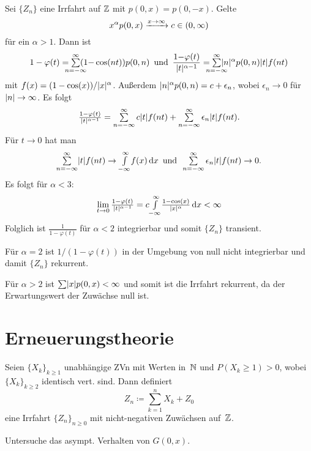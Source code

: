 \documentclass{cheat-sheet}
\begin{document}
\begin{bsp}
  Sei $\{ Z_n \}$ eine Irrfahrt auf $\mathbb{Z}$ mit $p(0, x) = p(0, -x)$.
  Gelte
  \[ x^\alpha p(0, x) \xrightarrow{x \to \infty} c \in \left( 0, \infty \right) \]
  für ein $\alpha > 1$.
  Dann ist
  \[
    1 - \varphi(t) = \sum_{\mathclap{n=-\infty}}^\infty (1{-}\cos(nt)) p(0, n)
    \enspace \text{und} \enspace
    \frac{1 {-} \varphi(t)}{\abs{t}^{\alpha - 1}} = \sum_{\mathclap{n=-\infty}}^\infty \abs{n}^\alpha p(0, n) \abs{t} f(n t)
  \]
  mit $f(x) = (1 - \cos(x))/\lvert x\rvert^\alpha$.
  Außerdem $\lvert n\rvert^\alpha p(0, n) = c + \epsilon_n$, wobei $\epsilon_n \to 0$ für $\lvert n\rvert \to \infty$.
  Es folgt
  \[
    \tfrac{1 - \varphi(t)}{\abs{t}^{\alpha - 1}} = \sum_{n=-\infty}^\infty c \abs{t} f(n t) + \sum_{n=-\infty}^\infty \epsilon_n \abs{t} f(n t).
  \]
  Für $t \to 0$ hat man
  \[
    \sum_{n=-\infty}^\infty \abs{t} f(n t) \to \Int{-\infty}{\infty}{f(x)}{x}
    \enspace \text{und} \enspace
    \sum_{n=-\infty}^\infty \epsilon_n \abs{t} f(n t) \to 0.
  \]
  Es folgt für $\alpha < 3$:
  \[ \lim_{t \to 0} \tfrac{1 - \varphi(t)}{\lvert t\rvert^{\alpha - 1}} = c {\textstyle \int\limits_{-\infty}^{\infty}} \tfrac{1 - \cos(x)}{\lvert x\rvert^\alpha} \,\mathrm{d} x < \infty \]
  Folglich ist $\tfrac{1}{1 - \varphi(t)}$ für $\alpha < 2$ integrierbar und somit $\{ Z_n \}$ transient.

  Für $\alpha = 2$ ist $1/(1 - \varphi(t))$ in der Umgebung von null nicht integrierbar und damit $\{ Z_n \}$ rekurrent.

  Für $\alpha > 2$ ist $\sum \abs{x} p(0, x) < \infty$ und somit ist die Irrfahrt rekurrent, da der Erwartungswert der Zuwächse null ist.
\end{bsp}


\section{Erneuerungstheorie}

\begin{situation}
  Seien $\{ X_k \}_{k \geq 1}$ unabhängige ZVn mit Werten in~$\mathbb{N}$ und $P(X_k \geq 1) > 0$, wobei $\{ X_k \}_{k \geq 2}$ identisch vert. sind.
  Dann definiert
  \[
  Z_n \coloneqq {\sum}_{k=1}^n X_k + Z_0
  \]
  eine Irrfahrt $\{ Z_n \}_{n \geq 0}$ mit nicht-negativen Zuwächsen auf~$\mathbb{Z}$.
\end{situation}

\begin{ziel}
  Untersuche das asympt. Verhalten von $G(0, x)$.
\end{ziel}
\end{document}
